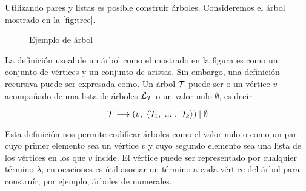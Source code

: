 Utilizando pares y listas es posible construír árboles. Consideremos el árbol mostrado en la \autoref{fig:tree}.
\begin{figure}[!htbp]
  \centering
  \caption{Ejemplo de árbol}
  \label{fig:tree}
\end{figure}

La definición usual de un árbol como el mostrado en la figura es como un conjunto de vértices y un conjunto de aristas. Sin embargo, una definición recursiva puede ser expresada como. Un árbol $ \mathcal{T} $ puede ser o un vértice $ v $ acompañado de una lista de árboles $ \mathcal{L}_{\mathcal{T}} $ o un valor nulo $ \emptyset $, es decir

\[ \mathcal{T} \longrightarrow (v,\ \langle \mathcal{T}_{1},\ ...\ ,\ \mathcal{T}_{k} \rangle) \mid \emptyset \]

Esta definición nos permite codificar árboles como el valor nulo o como un par cuyo primer elemento sea un vértice $ v $ y cuyo segundo elemento sea una lista de los vértices en los que $ v $ incide. El vértice puede ser representado por cualquier término $ λ $, en ocaciones es útil asociar un término a cada vértice del árbol para construír, por ejemplo, árboles de numerales.

